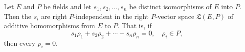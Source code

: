 Let $E$ and $P$ be fields and let $s_1, s_2, \ldots, s_n$ be distinct isomorphisms of $E$ into $P$. Then the $s_i$ are right $P$-independent in the right $P$-vector space $\mathfrak{L}(E, P)$ of additive homomorphisms from $E$ to $P$. That is, if
$$s_1 \rho_1 + s_2 \rho_2 + \cdots + s_n \rho_n = 0, \quad \rho_i \in P,$$
then every $\rho_i = 0$.
